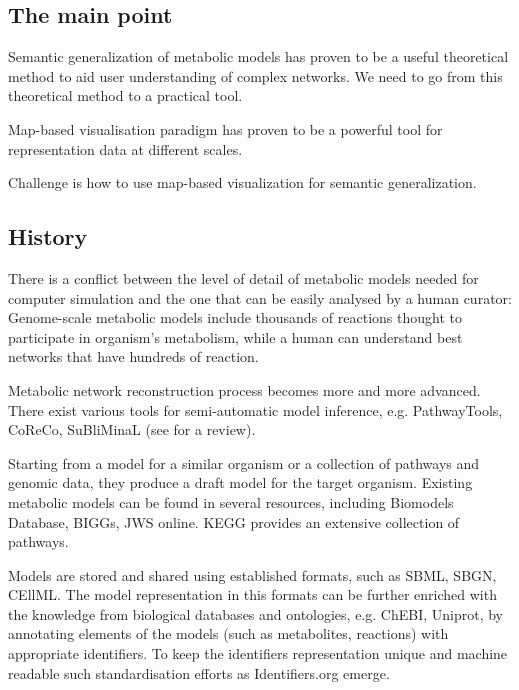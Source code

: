 \documentclass{bmcart}
\begin{document}
\subsection*{The main point}
Semantic generalization of metabolic models\cite{Zhukova2014} has proven to be a useful theoretical method to aid user understanding of complex networks. 
We need to go from this theoretical method to a practical tool.

Map-based visualisation paradigm has proven to be a powerful tool for representation data at different scales.

Challenge is how to use map-based visualization for semantic generalization.

\subsection*{History}
There is a conflict between the level of detail of metabolic models needed for computer simulation and the one that can be easily analysed by a human curator: Genome-scale metabolic models include thousands of reactions thought to participate in organism's metabolism, while a human can understand best networks that have hundreds of reaction.

Metabolic network reconstruction process becomes more and more advanced. There exist various tools for semi-automatic model inference, e.g. PathwayTools\cite{Karp2002}, CoReCo\cite{Pitkanen2014}, SuBliMinaL\cite{Swainston2011} (see \cite{Hamilton2014} for a review).

Starting from a model for a similar organism or a collection of pathways and genomic data, they produce a draft model for the target organism. Existing metabolic models can be found in several resources, including Biomodels Database\cite{Li10}, BIGGs\cite{Schellenberger2010}, JWS online\cite{Snoep2003}. KEGG\cite{Kanehisa12} provides an extensive collection of pathways. 

Models are stored and shared using established formats, such as SBML\cite{Hucka2003}, SBGN\cite{Moodie2011}, CEllML\cite{Lloyd2004}. The model representation in this formats can be further enriched with the knowledge from biological databases and ontologies, e.g. ChEBI\cite{deMatos10}, Uniprot\cite{TheUniProtConsortium2013}, by annotating elements of the models (such as metabolites, reactions) with appropriate identifiers. To keep the identifiers representation unique and machine readable such standardisation efforts as Identifiers.org\cite{Juty2012} emerge.
\end{document}
